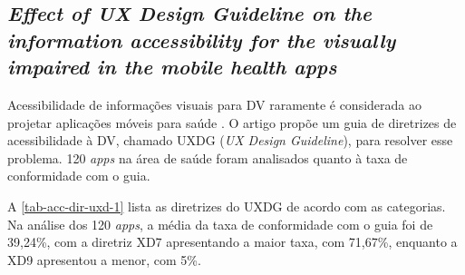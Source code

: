 \subsection{\emph{Effect of UX Design Guideline on the information accessibility for the visually impaired in the mobile health apps}}

Acessibilidade de informações visuais para DV raramente é considerada ao projetar aplicações móveis para saúde \cite{Kim20191103}.
O artigo propõe um guia de diretrizes de acessibilidade à DV, chamado UXDG (\emph{UX Design Guideline}), para resolver esse problema.
120 \emph{apps} na área de saúde foram analisados quanto à taxa de conformidade com o guia.

A \autoref{tab-acc-dir-uxd-1} lista as diretrizes do UXDG de acordo com as categorias.
Na análise dos 120 \emph{apps}, a média da taxa de conformidade com o guia foi de 39,24\%, com a diretriz XD7 apresentando a maior taxa, com 71,67\%, enquanto a XD9 apresentou a menor, com 5\%.

